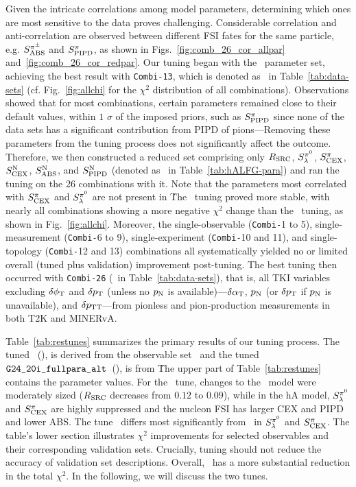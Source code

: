 Given the intricate correlations among model parameters, determining which ones are most sensitive to the data proves challenging. Considerable correlation and anti-correlation are observed between different FSI fates for the same particle, e.g. $S_\textrm{ABS}^{\pi^{\pm}}$ and $S_\textrm{PIPD}^{\pi}$, as shown in Figs.~\ref{fig:comb_26_cor_allpar} and~\ref{fig:comb_26_cor_redpar}. 
Our tuning began with the \allpar\ parameter set, achieving the best result with \texttt{Combi-13}, which is denoted as \cbAllPar\ in Table~\ref{tab:data-sets} (cf. Fig.~\ref{fig:allchi} for the $\chi^2$ distribution of all combinations).
Observations showed that for most combinations, certain parameters remained close to their default values, within $1$ $\sigma$ of the imposed priors, such as $S_\textrm{PIPD}^{\pi}$ since none of the data sets has a significant contribution from PIPD of pions---Removing these parameters from the tuning process does not significantly affect the outcome.
Therefore, we then constructed a reduced set comprising only $R_\textrm{SRC}$, $S_\lambda^{\pi^{0}}$, $S_\textrm{CEX}^{\pi}$, $S_\textrm{CEX}^\textrm{N}$, $S_\textrm{ABS}^\textrm{N}$, and $S_\textrm{PIPD}^\textrm{N}$ (denoted as \redpar\ in Table~\ref{tab:hALFG-para}) and ran the tuning on the 26 combinations with it. Note that the parameters most correlated with $S_\textrm{CEX}^{\pi}$ and $S_\lambda^{\pi^{0}}$ are not present in \redpar\. The \redpar\ tuning proved more stable, with nearly all combinations showing a more negative $\chi^2$ change than the \allpar\ tuning, as shown in Fig.~\ref{fig:allchi}. Moreover, the single-observable (\texttt{Combi-}1 to 5), single-measurement (\texttt{Combi-}6 to 9), single-experiment (\texttt{Combi-}10 and 11), and single-topology (\texttt{Combi-}12 and 13) combinations all systematically yielded no or limited overall (tuned plus validation) improvement post-tuning. The best tuning then occurred with \texttt{Combi-26} (\cbRedPar\ in Table~\ref{tab:data-sets}), that is, all TKI variables excluding $\delta\phi_\textrm{T}$ and $\delta p_\textrm{T}$ (unless no $p_\textrm{N}$ is available)---$\delta\alpha_\textrm{T}$, $p_\textrm{N}$ (or $\delta p_\textrm{T}$ if $p_\textrm{N}$ is unavailable), and $\delta p_\textrm{TT}$---from pionless and pion-production measurements in both T2K and MINERvA. 

Table~\ref{tab:restunes} summarizes the primary results of our tuning process. The tuned \redpar\, \restunefull (\gC), is derived from the observable set \cbRedPar\, and the tuned \allpar\, $\texttt{G24\_20i\_fullpara\_alt}$~(\gT), is from \cbAllPar\. The upper part of Table~\ref{tab:restunes} contains the parameter values. 
For the  \gC\ tune, changes to the \sfcfg\ model were moderately sized ($R_\textrm{SRC}$ decreases from $0.12$ to $0.09$), while in the hA model, $S_\lambda^{\pi^{0}}$ and $S_\textrm{CEX}^{\pi}$ are highly suppressed and the nucleon FSI has larger CEX and PIPD and lower ABS.  The tune \gT\ differs most significantly from \gC\ in $S_\lambda^{\pi^{0}}$ and $S_\textrm{CEX}^{\pi}$. The table's lower section illustrates $\chi^2$ improvements for selected observables and their corresponding validation sets. Crucially, tuning should not reduce the accuracy of validation set descriptions. Overall, \gC\ has a more substantial reduction in the total $\chi^2$. In the following, we will discuss the two tunes.

